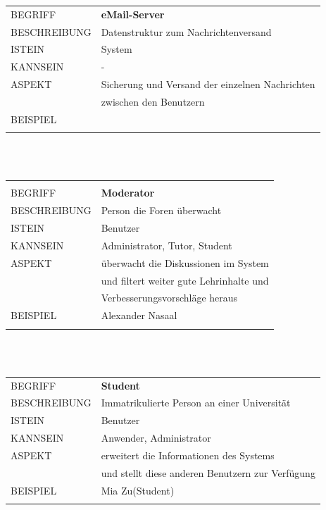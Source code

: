 \documentclass[12pt,a4paper]{article}
\begin{document}
\begin{tabular}{l p{12cm}}
BEGRIFF 	 & \textbf{eMail-Server} \\ 
BESCHREIBUNG & Datenstruktur zum Nachrichtenversand \\
ISTEIN   	 & System \\
KANNSEIN 	 & - \\ 
ASPEKT   	 & Sicherung und Versand der einzelnen Nachrichten\\
			 & zwischen den Benutzern \\
BEISPIEL 	 & \\\\
\hline
\end{tabular}\\\\   

\begin{tabular}{l p{12cm}}
\hline\\
BEGRIFF 	 & \textbf{Moderator} \\ 
BESCHREIBUNG & Person die Foren überwacht\\
ISTEIN   	 & Benutzer \\
KANNSEIN 	 & Administrator, Tutor, Student \\ 
ASPEKT   	 & überwacht die Diskussionen im System \\
 	     	 & und filtert weiter gute Lehrinhalte und\\
 	     	 & Verbesserungsvorschläge heraus\\
BEISPIEL 	 & Alexander Nasaal\\\\
\hline
\end{tabular}\\\\   

\begin{tabular}{l p{12cm}}
BEGRIFF 	 & \textbf{Student} \\ 
BESCHREIBUNG & Immatrikulierte Person an einer Universität \\ 
ISTEIN   	 & Benutzer \\
KANNSEIN 	 & Anwender, Administrator \\ 
ASPEKT   	 & erweitert die Informationen des Systems\\
 	     	 & und stellt diese anderen Benutzern zur Verfügung \\
BEISPIEL 	 & Mia Zu(Student)\\\\
\hline
\end{tabular}\\\\  
\end{document}
